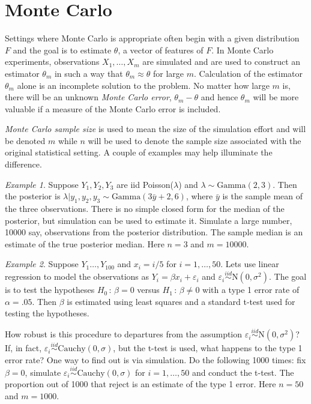\documentclass[12pt]{article}
\theoremstyle{plain}
\theoremstyle{definition}
\theoremstyle{remark}
\newtheorem{example}{Example}[section]
\begin{document}
\section{Monte Carlo}
\label{gofmc:sec:Monte Carlo}

Settings where Monte Carlo is appropriate often begin with a given
distribution $F$ and the goal is to estimate $\theta$, a vector of
features of $F$.  In Monte Carlo experiments, observations
$X_{1}, \ldots, X_{m}$ are simulated and are used to construct an
estimator $\theta_m$ in such a way that $\theta_m \approx \theta$ for
large $m$.  Calculation of the estimator $\theta_m$ alone is an
incomplete solution to the problem. No matter how large $m$ is, there
will be an unknown \textit{Monte Carlo error}, $\theta_m - \theta$ and
hence $\theta_m$ will be more valuable if a measure of the
Monte Carlo error is included. 

\textit{Monte Carlo sample size} is used to mean the size of the
simulation effort and  will be denoted $m$ while $n$ will be used to
denote the sample size associated with the original statistical
setting.  A couple of examples may help illuminate the difference.

\begin{example}
  Suppose $Y_1,Y_2, Y_3$ are iid Poisson($\lambda$) and $\lambda \sim
  \text{Gamma}(2,3)$.  Then the posterior is $\lambda| y_1, y_2, y_3
  \sim \text{Gamma}(3\bar{y} + 2, 6)$, where $\bar{y}$ is the sample
  mean of the three observations.  There is no simple closed form for
  the median of the posterior, but simulation can be used to estimate
  it.  Simulate a large number, 10000 say, observations from the
  posterior distribution.  The sample median is an estimate of the
  true posterior median.  Here $n=3$ and $m=10000$.
\end{example}

\begin{example}
  Suppose $Y_1 \ldots, Y_{100}$ and $x_i = i/5$ for $i=1,
  \ldots, 50$. Lets use linear regression to model the observations
  as $Y_i=\beta x_i + \varepsilon_i$ and $\varepsilon_i
  \stackrel{iid}{\sim}\text{N}(0, \sigma^2)$.  The goal is to test the
  hypotheses $H_0 \, : \, \beta=0$ versus $H_1 \, : \, \beta \neq 0$
  with a type 1 error rate of $\alpha=.05$.  Then $\beta$ is estimated
  using least squares and a standard t-test used for testing the
  hypotheses.

  How robust is this procedure to departures from the assumption
  $\varepsilon_i \stackrel{iid}{\sim}\text{N}(0, \sigma^2)$?  If, in
  fact, $\varepsilon_i \stackrel{iid}{\sim} \text{Cauchy}(0, \sigma)$,
  but the t-test is used, what happens to the type 1 error
  rate?  One way to find out is via simulation.  Do the following 1000
  times: fix $\beta=0$, simulate $\varepsilon_i \stackrel{iid}{\sim}
  \text{Cauchy}(0, \sigma)$ for $i=1, \ldots, 50$ and conduct the
  t-test.  The proportion out of 1000 that reject is an estimate of
  the type 1 error.  Here $n=50$ and $m = 1000$.
\end{example}
\end{document}
